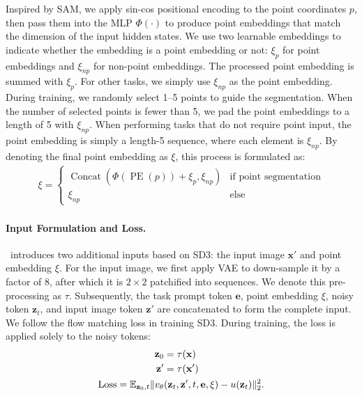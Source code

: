 Inspired by SAM, we apply sin-cos positional encoding to the point coordinates $p$, then pass them into the MLP $\Phi(\cdot)$  to produce point embeddings that match the dimension of the input hidden states. We use two learnable embeddings to indicate whether the embedding is a point embedding or not: $\xi_p$ for point embeddings and $\xi_{np}$ for non-point embeddings. The processed point embedding is summed with $\xi_p$. For other tasks, we simply use 
$\xi_{np}$ as the point embedding. During training, we randomly select 1–5 points to guide the segmentation. When the number of selected points is fewer than 5, we pad the point embeddings to a length of 5 with $\xi_{np}$. 
When performing tasks that do not require point input, the point embedding is simply a length-5 sequence, where each element is $\xi_{np}$.
By denoting the final point embedding as $\xi$,  this process is formulated as:
\begin{equation}
    \begin{aligned}
        \xi = 
            \begin{cases} 
            \operatorname{Concat}(\Phi(\operatorname{PE}(p))+\xi_{p}, \xi_{np}) & \text{if point segmentation} \\
            \xi_{np} & \text{else}
            \end{cases}
    \end{aligned}
\end{equation}
\paragraph{Input Formulation and Loss.}
\ours\ introduces two additional inputs based on SD3: the input image $\mathbf x'$ and point embedding $\xi$. For the input image, we first apply VAE to down-sample it by a factor of 8, after which it is $2\times2$ patchified into sequences. We denote this pre-processing as $\tau$. Subsequently, the task prompt token $\mathbf{e}$, point embedding $\xi$, noisy token $\mathbf{z}_t$, and input image token $\mathbf z'$ are concatenated to form the complete input.
We follow the flow matching loss in training SD3. During training, the loss is applied solely to the noisy tokens:
\begin{equation}
    \begin{aligned}
        \mathbf z_0 &= \tau(\mathbf x) \\
        \mathbf z' &= \tau(\mathbf x') \\
        {\rm Loss } = 
        {\mathbb E}_{\mathbf z_0,t} \Vert v_\theta&(\mathbf z_t, \mathbf z',t,\mathbf e, \xi) - u(\mathbf z_t) \Vert^2_2.
    \end{aligned}
\end{equation}

